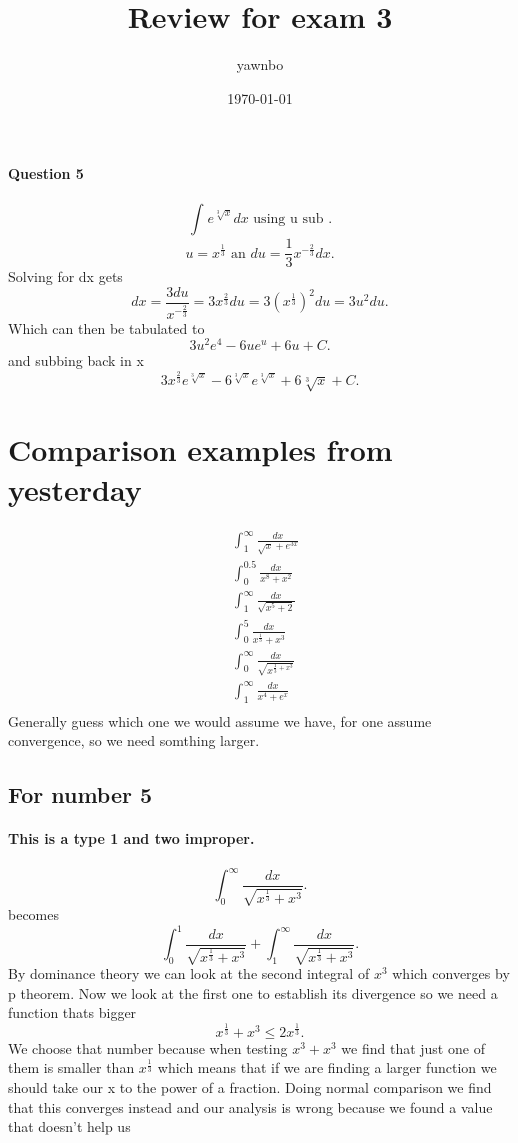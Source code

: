 \documentclass[a4paper]{article}
\title{Review for exam 3}
\author{yawnbo}
\date{\today}
\begin{document}
\paragraph{Question 5}
\[
\int_{}^{} e^{\sqrt[3]{x}}dx \text{ using u sub  }
.\] 
\[
u=x^{\frac{1}{3}} \text{ an } du=\frac{1}{3}x^{-\frac{2}{3}}dx
.\] 
Solving for dx gets 
\[
dx= \frac{3du}{x^{-\frac{2}{3}}}=3x^{\frac{2}{3}}du=3\left( x^{\frac{1}{3}} \right) ^2du=3u^2du
.\] 
Which can then be tabulated to
\[
3u^2e^{4}-6ue^{u}+6u+C
.\] 
and subbing back in x
\[
3x^{\frac{2}{3}}e^{\sqrt[3]{x}}-6^{\sqrt[3]{x}}e^{\sqrt[3]{x}}+6\sqrt[3]{x}+C
.\] 
\section{Comparison examples from yesterday}%
\label{sec:Comparison examples from yesterday}

\begin{align}
 &\int_{1}^{\infty} \frac{dx}{\sqrt{x}+e^{3x}} \\
 &\int_{0}^{0.5} \frac{dx}{x^{8}+x^2} \\
 &\int_{1}^{\infty} \frac{dx}{\sqrt{x^{5}+2}} \\
 &\int_{0}^{5} \frac{dx}{x^{\frac{1}{3}}+x^3} \\
 &\int_{0}^{\infty} \frac{dx}{\sqrt{x^{\frac{1}{3}+x^3}}} \\
 &\int_{1}^{\infty} \frac{dx}{x^{4}+e^{x}}\\
\end{align}
Generally guess which one we would assume we have, for one assume convergence, so we need somthing larger.
\newpage
\subsection{For number 5}%
\label{sub:For number 5}
\paragraph{This is a type 1 and two improper.}
\[
\int_{0}^{\infty} \frac{dx}{\sqrt{x^{\frac{1}{3}}+x^3}}
.\] 
becomes
\[
\int_{0}^{1} \frac{dx}{\sqrt{x^{\frac{1}{3}}+x^3}} + \int_{1}^{\infty} \frac{dx}{\sqrt{x^{\frac{1}{3}}+x^3}}
.\] 
By dominance theory we can look at the second integral of $x^3$ which converges by p theorem. 
Now we look at the first one to establish its divergence so we need a function thats bigger
\[
x^{\frac{1}{3}}+x^3 \le 2x^{\frac{1}{3}}
.\] 
We choose that number because when testing $x^3+x^3$ we find that just one of them is smaller than $x^{\frac{1}{3}}$ which means that if we are finding a larger function we should take our x to the power of a fraction.
Doing normal comparison we find that this converges instead and our analysis is wrong because we found a value that doesn't help us
\end{document}

